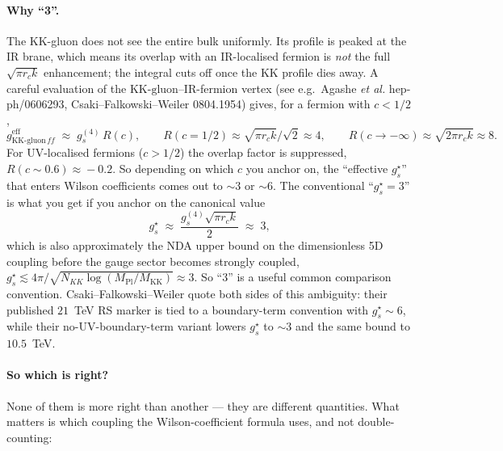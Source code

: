 \documentclass[11pt]{article}
\newcommand{\Mkk}{M_{\mathrm{KK}}}
\newcommand{\Mpl}{M_{\mathrm{Pl}}}
\newcommand{\gs}{g_s^{\star}}
\newcommand{\gsfour}{g_s^{(4)}}
\newcommand{\KKgluon}{\mathrm{KK\text{-}gluon}}
\begin{document}
\paragraph{Why ``3''.}
The KK-gluon does not see the entire bulk uniformly. Its profile is peaked
at the IR brane, which means its overlap with an IR-localised fermion is
\emph{not} the full $\sqrt{\pi r_c k}$ enhancement; the integral cuts off
once the KK profile dies away. A careful evaluation of the
$\KKgluon$--IR-fermion vertex (see e.g.\ Agashe \emph{et al.}
hep-ph/0606293, Csaki--Falkowski--Weiler 0804.1954) gives, for a fermion
with $c < 1/2$,
\begin{equation}
  g_{\KKgluon\,f f}^{\mathrm{eff}}
  \;\approx\; \gsfour\,R(c),
  \qquad
  R(c=1/2)\!\approx\! \sqrt{\pi r_c k}/\sqrt{2} \!\approx\! 4,
  \qquad
  R(c\to -\infty)\!\approx\! \sqrt{2\pi r_c k}\!\approx\! 8.
\end{equation}
For UV-localised fermions ($c > 1/2$) the overlap factor is suppressed,
$R(c\!\sim\!0.6)\!\approx\!-0.2$. So depending on which $c$ you anchor on,
the ``effective $\gs$'' that enters Wilson coefficients comes out to $\sim
3$ or $\sim 6$. The conventional ``$\gs = 3$'' is what you get if you
anchor on the canonical value
\begin{equation}
  \gs \;\approx\; \frac{\gsfour\sqrt{\pi r_c k}}{2} \;\approx\; 3,
\end{equation}
which is also approximately the NDA upper bound on the dimensionless 5D
coupling before the gauge sector becomes strongly coupled,
$\gs \lesssim 4\pi/\sqrt{N_{KK}\log(\Mpl/\Mkk)}\!\approx\!3$. So ``3'' is
a useful common comparison convention.  Csaki--Falkowski--Weiler quote
both sides of this ambiguity: their published $21$~TeV RS marker is tied
to a boundary-term convention with $\gs\!\sim\!6$, while their
no-UV-boundary-term variant lowers $\gs$ to $\sim\!3$ and the same
bound to $10.5$~TeV.

\paragraph{So which is right?}
None of them is more right than another --- they are different
quantities. What matters is which coupling the Wilson-coefficient
formula uses, and not double-counting:
\end{document}
